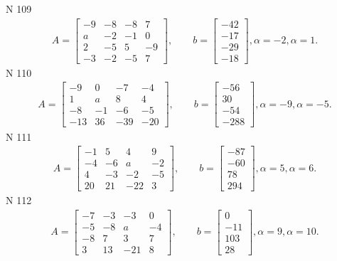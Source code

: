 \documentclass[11pt]{report}
\begin{document}
N 109
\begin{align*}
 A = \left[\begin{matrix}-9 & -8 & -8 & 7\\a & -2 & -1 & 0\\2 & -5 & 5 & -9\\-3 & -2 & -5 & 7\end{matrix}\right],
    \qquad b = \left[\begin{matrix}-42\\-17\\-29\\-18\end{matrix}\right], \alpha = -2, \alpha = 1. 
 \end{align*}
N 110
\begin{align*}
 A = \left[\begin{matrix}-9 & 0 & -7 & -4\\1 & a & 8 & 4\\-8 & -1 & -6 & -5\\-13 & 36 & -39 & -20\end{matrix}\right],
    \qquad b = \left[\begin{matrix}-56\\30\\-54\\-288\end{matrix}\right], \alpha = -9, \alpha = -5. 
 \end{align*}
N 111
\begin{align*}
 A = \left[\begin{matrix}-1 & 5 & 4 & 9\\-4 & -6 & a & -2\\4 & -3 & -2 & -5\\20 & 21 & -22 & 3\end{matrix}\right],
    \qquad b = \left[\begin{matrix}-87\\-60\\78\\294\end{matrix}\right], \alpha = 5, \alpha = 6. 
 \end{align*}
N 112
\begin{align*}
 A = \left[\begin{matrix}-7 & -3 & -3 & 0\\-5 & -8 & a & -4\\-8 & 7 & 3 & 7\\3 & 13 & -21 & 8\end{matrix}\right],
    \qquad b = \left[\begin{matrix}0\\-11\\103\\28\end{matrix}\right], \alpha = 9, \alpha = 10. 
 \end{align*}
\end{document}
